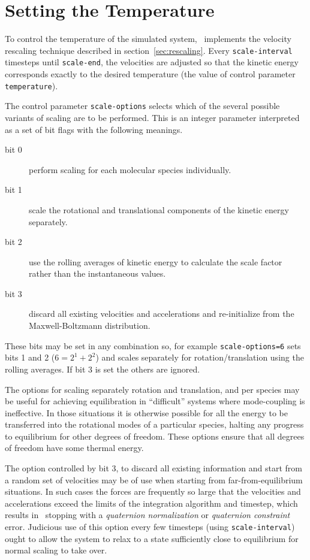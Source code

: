 \section{Setting the Temperature}%

To control the temperature of the simulated system, \moldy\  implements
the velocity rescaling technique described in
section~\ref{sec:rescaling}.  
Every \verb'scale-interval' timesteps until
\verb'scale-end', the velocities are adjusted so that the kinetic
energy corresponds exactly to the desired temperature (the value of
control parameter \verb'temperature').

The control parameter \verb'scale-options' selects which of the
several possible variants of scaling are to be performed. This is an integer
parameter interpreted as a set of bit flags with the following meanings.
\begin{description}
\item[bit 0]    perform scaling for each molecular species individually.
\item[bit 1]    scale the rotational and translational components of
the kinetic energy separately.
\item[bit 2]    use the rolling averages of kinetic energy to
calculate the scale factor rather than the instantaneous values.
\item[bit 3]    discard all existing velocities and accelerations and
re-initialize from the Maxwell-Boltzmann distribution.
\end{description}
These bits may be set in any combination so, for example
\verb'scale-options=6' sets bits 1 and 2 ($ 6 = 2^1 + 2^2$) and scales
separately for rotation/translation using the rolling averages.  If
bit 3 is set the others are ignored.

The options for scaling separately rotation and translation, and per
species may be useful for achieving equilibration in ``difficult''
systems where mode-coupling is ineffective.  In those situations it is
otherwise possible for all the energy to be transferred into the
rotational modes of a particular species, halting any progress to
equilibrium for other degrees of freedom.   These options ensure that
all degrees of freedom have some thermal energy.

The option controlled by bit 3, to discard all existing information
and start from a random set of velocities may be of use when starting
from far-from-equilibrium situations.  In such cases the forces
are frequently so large that the velocities and accelerations exceed
the limits of the integration algorithm and timestep, which results in
\moldy\ stopping with a {\em quaternion normalization\/} or {\em
quaternion constraint\/} error.  Judicious use of this option every few
timesteps (using \verb'scale-interval') ought to allow the system to
relax to a state sufficiently close to equilibrium for normal scaling
to take over.

